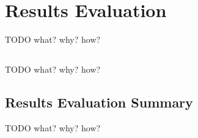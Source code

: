 
\chapter{Results Evaluation}
TODO what? why? how?
\section{}
TODO what? why? how?
\section{Results Evaluation Summary}
TODO what? why? how?